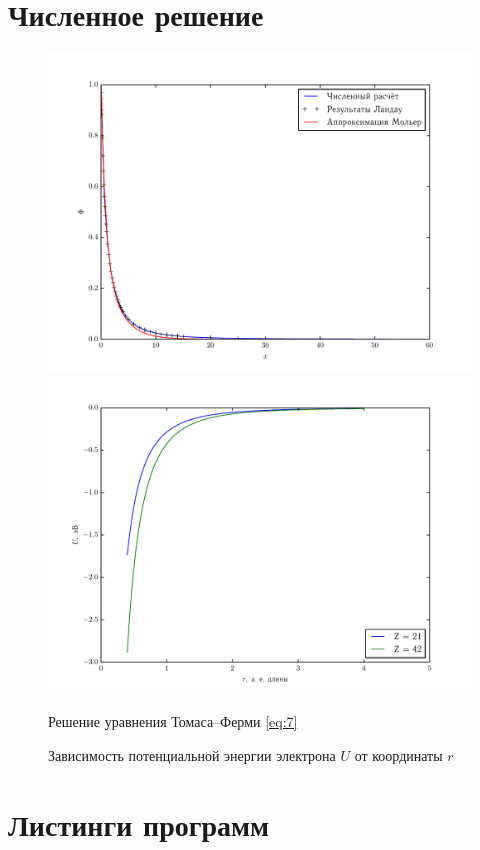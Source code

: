 \documentclass[10pt]{hedlab}
\begin{document}
  \section{Численное решение}
  \begin{figure}[h!]
    \vspace{-1em} \hspace{-2em}
      \includegraphics[width=.55\textwidth]{common} \hspace{-3em}
      \includegraphics[width=.55\textwidth]{Z_21_42} \\
    \parbox{.49\textwidth}{\caption{Решение уравнения Томаса--Ферми
      \eqref{eq:7}} \label{fig:1}}
      \parbox{.49\textwidth}{\caption{Зависимость потенциальной энергии
      электрона \( U \) от координаты \( r \)} \label{fig:2}}    
  \end{figure}
  \newpage
  \section{Листинги программ}
  
  
  \vspace{1.5em}
  
 
\end{document}
